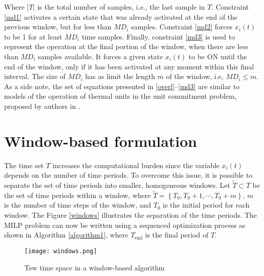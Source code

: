 Where $|T|$ is the total number of samples, i.e., the last sample in $T$. Constraint \eqref{md1} activates a certain state that was already activated at the end of the previous window, but for less than $MD_i$ samples. Constraint \eqref{md2} forces $x_i(t)$ to be 1 for at least $MD_i$ time samples. Finally, constraint \eqref{md3} is used to represent the operation at the final portion of the window, when there are less than $MD_i$ samples available. It forces a given state $x_i(t)$ to be ON until the end of the window, only if it has been activated at any moment within this final interval. The size of $MD_i$ has as limit the length $m$ of the window, i.e, $MD_i \leq m$. 
As a side note, the set of equations presented in \eqref{overl}--\eqref{md3} are similar to models of the operation of thermal units in the unit commitment problem, proposed by authors in \cite{carrion2006}.

\section{Window-based formulation}
The time set $T$ increases the computational burden since the variable $x_i(t)$ depends on the number of time periods. To overcome this issue, it is possible to separate the set of time periods into smaller, homogeneous windows. Let $\tilde{T} \subset T$ be the set of time periods within a window, where $\tilde{T} = \left\{ T_{0} , T_{0} + 1, \cdots , T_{0} + m \right\}$, $m$ is the number of time steps of the window, and $T_{0}$ is the initial period for each window. The Figure \ref{windows} illustrates the separation of the time periods. The MILP problem can now be written using a sequenced  optimization process as shown in Algorithm \ref{algorithm1}, where $T_{\text{end}}$ is the final period of $T$.


\begin{figure}[tb]
    \centering
    \texttt{[image: windows.png]}
    \caption{Tew time space in a window-based algorithm}
    \label{example}
\end{figure}



